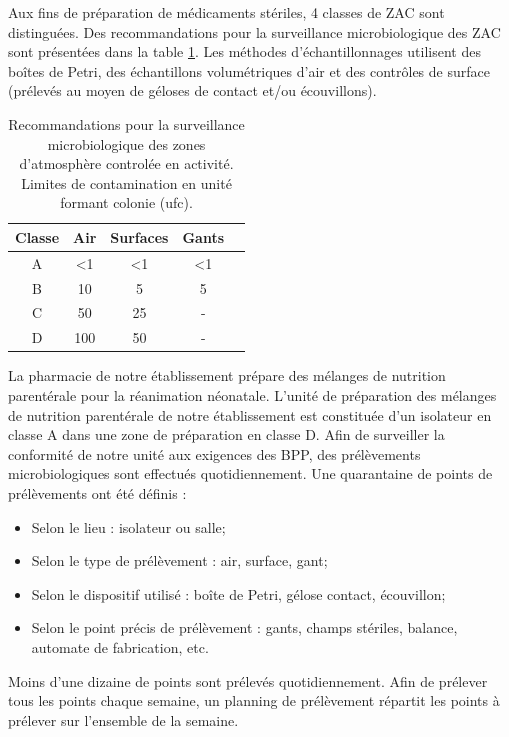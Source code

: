 \documentclass[12pt,a4paper,oneside]{article}
\begin{document}
Aux fins de préparation de médicaments stériles, 4 classes de ZAC sont distinguées. Des recommandations pour la surveillance microbiologique des ZAC sont présentées dans la table \ref{zac}. Les méthodes d'échantillonnages utilisent des boîtes de Petri, des échantillons volumétriques d'air et des contrôles de surface (prélevés au moyen de géloses de contact et/ou écouvillons).
\begin{table}[h]
\caption{Recommandations pour la surveillance microbiologique des zones d'atmosphère controlée en activité. Limites de contamination en unité formant colonie (ufc).\label{zac}}
\begin{center}
\begin{tabular}{|c|c|c|c|c|}
	\hline
	\textbf{Classe} & \textbf{Air} &\textbf{Surfaces} & \textbf{Gants}\\
	\hline
	A & <1 & <1 & <1\\
	B & 10 & 5 & 5\\
	C & 50 & 25 & -\\
	D & 100 & 50 & -\\
	
	\hline
\end{tabular}
\end{center}
\end{table}

La pharmacie de notre établissement prépare des mélanges de nutrition parentérale pour la réanimation néonatale. L'unité de préparation des mélanges de nutrition parentérale de notre établissement est constituée d'un isolateur en classe A dans une zone de préparation en classe D. Afin de surveiller la conformité de notre unité aux exigences des BPP, des prélèvements microbiologiques sont effectués quotidiennement. Une quarantaine de points de prélèvements ont été définis :
\begin{itemize}
 \item Selon le lieu : isolateur ou salle;
 \item Selon le type de prélèvement : air, surface, gant;
 \item Selon le dispositif utilisé : boîte de Petri, gélose contact, écouvillon;
 \item Selon le point précis de prélèvement : gants, champs stériles, balance, automate de fabrication, etc.
 \end{itemize}
Moins d'une dizaine de points sont prélevés quotidiennement. Afin de prélever tous les points chaque semaine, un planning de prélèvement répartit les points à prélever sur l'ensemble de la semaine.
\end{document}
